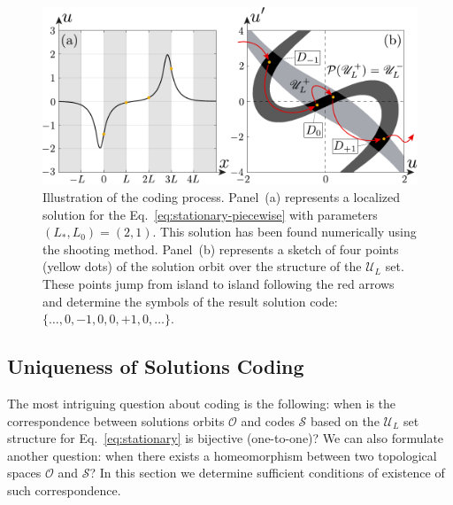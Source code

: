 \begin{figure}[h]
\centering
	\includegraphics[scale = 1]{pic/solution and orbit on the phase plane}
	\caption{
		Illustration of the coding process.
		Panel~(a) represents a localized solution for the Eq.~\eqref{eq:stationary-piecewise} with parameters $(L_*, L_0) = (2, 1)$.
		This solution has been found numerically using the shooting method.
		Panel~(b) represents a sketch of four points (yellow dots) of the solution orbit over the structure of the $\mathscr{U}_L$ set.
		These points jump from island to island following the red arrows and determine the symbols of the result solution code: $\{ \dots, 0, -1, 0, 0, +1, 0, \dots \}$.
	}
\label{fig:solution-and-orbit}
\end{figure}

\subsection{Uniqueness of Solutions Coding}

The most intriguing question about coding is the following: when is the correspondence between solutions orbits $\mathcal{O}$ and codes $\mathcal{S}$ based on the $\mathscr{U}_L$ set structure for Eq.~\eqref{eq:stationary} is bijective (one-to-one)?
We can also formulate another question: when there exists a homeomorphism between two topological spaces $\mathcal{O}$ and $\mathcal{S}$?
In this section we determine sufficient conditions of existence of such correspondence.

